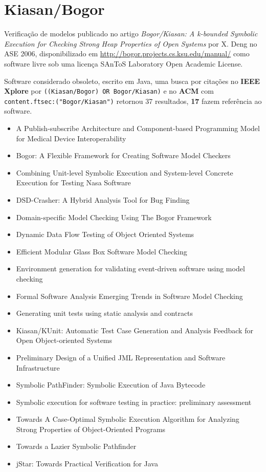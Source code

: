 \section{Kiasan/Bogor}

Verificação de modelos
publicado no artigo {\it Bogor/Kiasan: A k-bounded Symbolic Execution for Checking Strong Heap Properties of Open Systems}
por X. Deng
no ASE 2006,
disponibilizado em \url{http://bogor.projects.cs.ksu.edu/manual/}
como software livre
sob uma licença SAnToS Laboratory Open Academic License.

Software considerado obsoleto,
escrito em Java,
uma busca por citações no {\bf IEEE Xplore} por
\texttt{((Kiasan/Bogor) OR Bogor/Kiasan)}
e no {\bf ACM} com
\texttt{content.ftsec:("Bogor/Kiasan")}
retornou
37 resultados,
{\bf 17} fazem referência ao software.

\begin{itemize}
\item A Publish-subscribe Architecture and Component-based Programming Model for Medical Device Interoperability
\item Bogor: A Flexible Framework for Creating Software Model Checkers
\item Combining Unit-level Symbolic Execution and System-level Concrete Execution for Testing Nasa Software
\item DSD-Crasher: A Hybrid Analysis Tool for Bug Finding
\item Domain-specific Model Checking Using The Bogor Framework
\item Dynamic Data Flow Testing of Object Oriented Systems
\item Efficient Modular Glass Box Software Model Checking
\item Environment generation for validating event-driven software using model checking
\item Formal Software Analysis Emerging Trends in Software Model Checking
\item Generating unit tests using static analysis and contracts
\item Kiasan/KUnit: Automatic Test Case Generation and Analysis Feedback for Open Object-oriented Systems
\item Preliminary Design of a Unified JML Representation and Software Infrastructure
\item Symbolic PathFinder: Symbolic Execution of Java Bytecode
\item Symbolic execution for software testing in practice: preliminary assessment
\item Towards A Case-Optimal Symbolic Execution Algorithm for Analyzing Strong Properties of Object-Oriented Programs
\item Towards a Lazier Symbolic Pathfinder
\item jStar: Towards Practical Verification for Java
\end{itemize}


